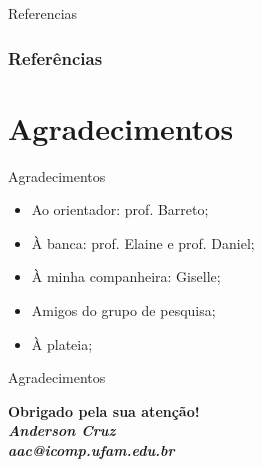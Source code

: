 \documentclass{beamer}
\begin{document}
\begin{frame}{Referencias}
\frametitle{Referências}
    \tiny{ }
    
\end{frame}


\section{Agradecimentos}
\begin{frame}{Agradecimentos}
\begin{itemize}
 \item Ao orientador: prof. Barreto; 
\item À banca: prof. Elaine e prof. Daniel;
\item À minha companheira: Giselle;
\item Amigos do grupo de pesquisa;
\item À plateia;
\end{itemize}

\end{frame}

  \begin{frame}{Agradecimentos}
  \begin{center}
 
  \textcolor{VerdeUFAM}{\Large \textbf{Obrigado pela sua atenção!}} \\
  \vspace*{20px}
  \textit{\textbf{Anderson Cruz}} \\
  \textit{\textbf{aac@icomp.ufam.edu.br}}
 
  \end{center}
  \end{frame}

 
 
\end{document}
